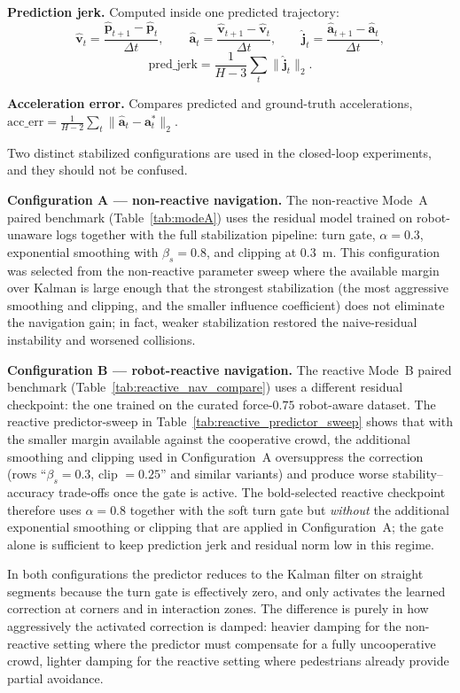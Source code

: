 \documentclass[12pt, a4paper]{article}
\begin{document}
\textbf{Prediction jerk.} Computed inside one predicted trajectory:
\[
\hat{\mathbf{v}}_t=\frac{\hat{\mathbf{p}}_{t+1}-\hat{\mathbf{p}}_t}{\Delta t},
\qquad
\hat{\mathbf{a}}_t=\frac{\hat{\mathbf{v}}_{t+1}-\hat{\mathbf{v}}_t}{\Delta t},
\qquad
\hat{\mathbf{j}}_t=\frac{\hat{\mathbf{a}}_{t+1}-\hat{\mathbf{a}}_t}{\Delta t},
\]
\[
\mathrm{pred\_jerk}=\frac{1}{H-3}\sum_{t}\|\hat{\mathbf{j}}_t\|_2.
\]

\textbf{Acceleration error.} Compares predicted and ground-truth accelerations,
$\mathrm{acc\_err}=\tfrac{1}{H-2}\sum_t\|\hat{\mathbf{a}}_t-\mathbf{a}^{*}_t\|_2$.

Two distinct stabilized configurations are used in the closed-loop experiments, and they should not be confused.

\textbf{Configuration A --- non-reactive navigation.} The non-reactive Mode~A paired benchmark (Table~\ref{tab:modeA}) uses the residual model trained on robot-unaware logs together with the full stabilization pipeline: turn gate, $\alpha=0.3$, exponential smoothing with $\beta_s=0.8$, and clipping at $0.3$~m. This configuration was selected from the non-reactive parameter sweep where the available margin over Kalman is large enough that the strongest stabilization (the most aggressive smoothing and clipping, and the smaller influence coefficient) does not eliminate the navigation gain; in fact, weaker stabilization restored the naive-residual instability and worsened collisions.

\textbf{Configuration B --- robot-reactive navigation.} The reactive Mode~B paired benchmark (Table~\ref{tab:reactive_nav_compare}) uses a different residual checkpoint: the one trained on the curated force-$0.75$ robot-aware dataset. The reactive predictor-sweep in Table~\ref{tab:reactive_predictor_sweep} shows that with the smaller margin available against the cooperative crowd, the additional smoothing and clipping used in Configuration~A oversuppress the correction (rows ``$\beta_s=0.3$, clip $=0.25$'' and similar variants) and produce worse stability--accuracy trade-offs once the gate is active. The bold-selected reactive checkpoint therefore uses $\alpha=0.8$ together with the soft turn gate but \emph{without} the additional exponential smoothing or clipping that are applied in Configuration~A; the gate alone is sufficient to keep prediction jerk and residual norm low in this regime.

In both configurations the predictor reduces to the Kalman filter on straight segments because the turn gate is effectively zero, and only activates the learned correction at corners and in interaction zones. The difference is purely in how aggressively the activated correction is damped: heavier damping for the non-reactive setting where the predictor must compensate for a fully uncooperative crowd, lighter damping for the reactive setting where pedestrians already provide partial avoidance.
\end{document}

